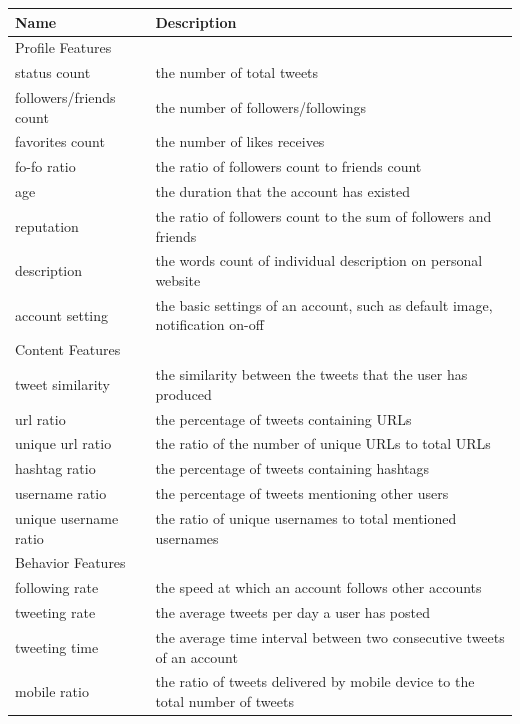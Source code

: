 \documentclass[a4paper, 12pt]{report}
\begin{document}
\begin{table}[H]
	 \label{tab:title} 
	\begin{center}
		\begin{tabular}{p{4.5cm} | p{11cm}}
			\hline
			Name & Description \\
			\hline
			\multicolumn{2}{|l|}{Profile Features} \\
			\hline
			status count & the number of total tweets \\
			followers/friends count& the number of followers/followings \\
			favorites count & the number of likes receives\\
			fo-fo ratio & the ratio of followers count to friends count \\
			age & the duration that the account has existed \\
			reputation & the ratio of followers count to the sum of followers and friends\\
			description & the words count of individual description on personal website \\
			account setting & the basic settings of an account, such as default image, notification on-off  \\
			\hline
			\multicolumn{2}{|l|}{Content Features} \\
			\hline
			tweet similarity & the similarity between the tweets that the user has produced \\
			url ratio & the percentage of tweets containing URLs  \\
			unique url ratio & the ratio of the number of unique URLs to total URLs\\
			hashtag ratio & the percentage of tweets containing hashtags \\
			username ratio & the percentage of tweets mentioning other users\\
			unique username ratio & the ratio of unique usernames to total mentioned usernames \\
			\hline
			\multicolumn{2}{|l|}{Behavior Features} \\
			\hline
			following rate & the speed at which an account follows other accounts \\
			tweeting rate & the average tweets per day a user has posted \\
			tweeting time & the average time interval between two consecutive tweets of an account \\
			mobile ratio & the ratio of tweets delivered by mobile device to the total number of tweets \\

\end{tabular}
\end{center}
\end{table}
\end{document}

